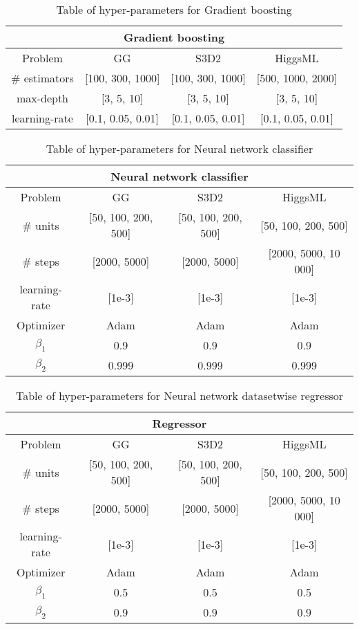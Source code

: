 

\begin{table}[ht!]
\centering
\begin{tabular}{||c c c c||} 
 \hline
 \multicolumn{4}{|c|}{Gradient boosting}\\
 \hline
 Problem & GG & S3D2 & HiggsML \\ [0.5ex] 
 \hline
 \# estimators & [100, 300, 1000] & [100, 300, 1000] & [500, 1000, 2000] \\ 
 max-depth     & [3, 5, 10] & [3, 5, 10] & [3, 5, 10] \\
 learning-rate & [0.1, 0.05, 0.01] & [0.1, 0.05, 0.01] & [0.1, 0.05, 0.01] \\
 \hline
\end{tabular}
\caption{Table of hyper-parameters for Gradient boosting}
\label{table:HP_GB}
\end{table}


\begin{table}[ht!]
\centering
\begin{tabular}{||c c c c||} 
 \hline
 \multicolumn{4}{|c|}{Neural network classifier}\\
 \hline
 Problem & GG & S3D2 & HiggsML \\ [0.5ex] 
 \hline
 \# units & [50, 100, 200, 500] & [50, 100, 200, 500] & [50, 100, 200, 500] \\ 
 \# steps & [2000, 5000] & [2000, 5000] & [2000, 5000, 10 000] \\
 learning-rate & [1e-3] & [1e-3] & [1e-3] \\
 Optimizer & Adam & Adam & Adam \\
 $\beta_1$ & 0.9 & 0.9 & 0.9 \\
 $\beta_2$ & 0.999 & 0.999 & 0.999 \\
 \hline
\end{tabular}
\caption{Table of hyper-parameters for Neural network classifier}
\label{table:HP_NN}
\end{table}



\begin{table}[ht!]
\centering
\begin{tabular}{||c c c c||} 
 \hline
 \multicolumn{4}{|c|}{Regressor}\\
 \hline
 Problem & GG & S3D2 & HiggsML \\ [0.5ex] 
 \hline
 \# units & [50, 100, 200, 500] & [50, 100, 200, 500] & [50, 100, 200, 500] \\ 
 \# steps & [2000, 5000] & [2000, 5000] & [2000, 5000, 10 000] \\
 learning-rate & [1e-3] & [1e-3] & [1e-3] \\
 Optimizer & Adam & Adam & Adam \\
 $\beta_1$ & 0.5 & 0.5 & 0.5 \\
 $\beta_2$ & 0.9 & 0.9 & 0.9 \\
 \hline
\end{tabular}
\caption{Table of hyper-parameters for Neural network datasetwise regressor}
\label{table:HP_REG}
\end{table}






